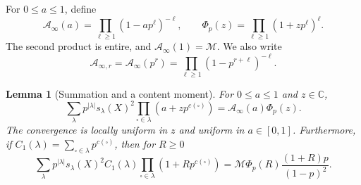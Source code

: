 \documentclass[11pt]{article}
\numberwithin{equation}{section}
\newtheorem{lemma}[lemma]{Lemma}
\theoremstyle{definition}
\theoremstyle{remark}
\newcommand{\C}{\mathbb{C}}
\begin{document}
For $0\le a\le1$, define
\begin{equation}\label{eq:infinite-normalizer-and-Phi}
 \mathcal A_\infty(a)=\prod_{\ell\ge1}(1-ap^\ell)^{-\ell},
 \qquad
 \Phi_p(z)=\prod_{\ell\ge1}(1+zp^\ell)^\ell.
\end{equation}
The second product is entire, and $\mathcal A_\infty(1)=\mathcal M$.
We also write
\begin{equation}\label{eq:infinite-shifted-normalizer}
 \mathcal A_{\infty,r}=\mathcal A_\infty(p^r)
 =\prod_{\ell\ge1}(1-p^{r+\ell})^{-\ell}.
\end{equation}

\begin{lemma}[Summation and a content moment]\label{lem:super-schur-bound}
For $0\le a\le1$ and $z\in\C$,
\begin{equation}\label{eq:infinite-super-cauchy}
 \sum_\lambda p^{|\lambda|}s_\lambda(X)^2
 \prod_{\square\in\lambda}(a+zp^{c(\square)})
 =\mathcal A_\infty(a)\Phi_p(z).
\end{equation}
The convergence is locally uniform in $z$ and uniform in $a\in[0,1]$.
Furthermore, if
$C_1(\lambda)=\sum_{\square\in\lambda}p^{c(\square)}$, then for $R\ge0$
\begin{equation}\label{eq:content-moment-bound}
 \sum_\lambda p^{|\lambda|}s_\lambda(X)^2 C_1(\lambda)
 \prod_{\square\in\lambda}(1+Rp^{c(\square)})
 =\mathcal M\Phi_p(R)\frac{(1+R)p}{(1-p)^2}.
\end{equation}
\end{lemma}
\end{document}
